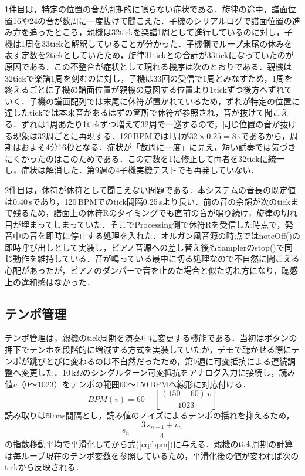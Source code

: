 \documentclass[uplatex,dvipdfmx]{jlreq}
\begin{document}
1件目は，特定の位置の音が周期的に鳴らない症状である．旋律の途中，譜面位置16や24の音が数周に一度抜けて聞こえた．子機のシリアルログで譜面位置の進み方を追ったところ，親機は32tickを楽譜1周として進行しているのに対し，子機は1周を33tickと解釈していることが分かった．子機側でループ末尾の休みを表す定数を2tickとしていたため，旋律31tickとの合計が33tickになっていたのが原因である．この不整合が症状として現れる機序は次のとおりである．親機は32tickで楽譜1周を刻むのに対し，子機は33回の受信で1周とみなすため，1周を終えるごとに子機の譜面位置が親機の意図する位置より1tickずつ後方へずれていく．子機の譜面配列では末尾に休符が置かれているため，ずれが特定の位置に達したtickでは本来音があるはずの箇所で休符が参照され，音が抜けて聞こえる．ずれは1周あたり1tickずつ増えて32周で一巡するので，同じ位置の音が抜ける現象は32周ごとに再現する．120\,BPMでは1周が$32 \times 0.25 = 8\,\mathrm{s}$であるから，周期はおよそ4分16秒となる．症状が「数周に一度」に見え，短い試奏では気づきにくかったのはこのためである．この定数を1に修正して両者を32tickに統一し，症状は解消した．第9週の4子機実機テストでも再発していない．

2件目は，休符が休符として聞こえない問題である．本システムの音長の既定値は0.40\,sであり，120\,BPMでのtick間隔0.25\,sより長い．前の音の余韻が次のtickまで残るため，譜面上の休符Rのタイミングでも直前の音が鳴り続け，旋律の切れ目が埋まってしまっていた．そこでProcessing側で休符Rを受信した時点で，発音中の音を即時に停止する処理を入れた．オルガン風音源の時点ではnoteOff()の即時呼び出しとして実装し，ピアノ音源への差し替え後もSamplerのstop()で同じ動作を維持している．音が鳴っている最中に切る処理なので不自然に聞こえる心配があったが，ピアノのダンパーで音を止めた場合と似た切れ方になり，聴感上の違和感はなかった．

\subsection{テンポ管理}
\label{sec:tempo}

テンポ管理は，親機のtick周期を演奏中に変更する機能である．当初はボタンの押下でテンポを段階的に増減する方式を実装していたが，デモで聴かせる際にテンポが跳びとびに変わるのは不自然だったため，第9週に可変抵抗による連続調整へ変更した．10\,k$\Omega$のシングルターン可変抵抗をアナログ入力に接続し，読み値$v$（0〜1023）をテンポの範囲60〜150\,BPMへ線形に対応付ける．
\begin{equation}
\mathit{BPM}(v) = 60 + \left\lfloor \frac{(150-60)\,v}{1023} \right\rfloor
\label{eq:bpm}
\end{equation}
読み取りは50\,ms間隔とし，読み値のノイズによるテンポの揺れを抑えるため，
\begin{equation}
s_n = \frac{3\,s_{n-1} + v_n}{4}
\label{eq:ema}
\end{equation}
の指数移動平均で平滑化してから式(\ref{eq:bpm})に与える．親機のtick周期の計算は毎ループ現在のテンポ変数を参照しているため，平滑化後の値が変われば次のtickから反映される．
\end{document}
